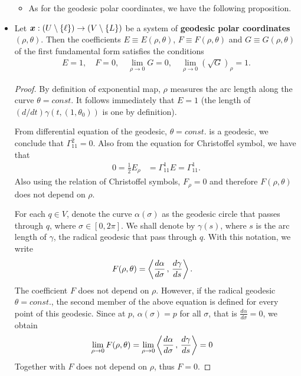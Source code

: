\documentclass[11pt]{article}
\begin{document}
\begin{itemize}
\begin{itemize}
\item As for the geodesic polar coordinates, we have the following proposition.
\end{itemize}

\item \begin{proposition}\label{prop: exp_map_first_fund}
Let $\boldsymbol{x}: (U \setminus \left\{\ell\right\})\rightarrow (V \setminus \left\{L\right\})$  be a system of \textbf{geodesic polar coordinates} $(\rho, \theta)$. Then the coefficients $E\equiv E(\rho, \theta)$, $F\equiv F(\rho, \theta)$ and $G\equiv G(\rho, \theta)$ of the first fundamental form satisfies the conditions
\begin{align*}
E = 1, \quad F=0, \quad \lim_{\rho \rightarrow 0}G = 0, \quad \lim_{\rho\rightarrow 0}(\sqrt{G})_{\rho} = 1.
\end{align*}
\end{proposition}
\begin{proof}
By definition of exponential map, $\rho$ measures the arc length along the curve $\theta = const.$ It follows immediately that $E= 1$ (the length of $(d/dt)\gamma(t,(1,\theta_{0}))$ is one by definition). 

From differential equation of the geodesic, $\theta = const.$ is a geodesic, we conclude that $\Gamma_{11}^{2} = 0$. Also from the equation for Christoffel symbol, we have that
\begin{align*}
0= \frac{1}{2}E_{\rho}&= \Gamma_{11}^{1}E = \Gamma_{11}^{1}.
\end{align*}
Also using the relation of Christoffel symbols, $F_{\rho} = 0$ and therefore $F(\rho, \theta)$ does not depend on $\rho$.

For each $q\in V$, denote the curve $\alpha(\sigma)$ as the geodesic circle that passes through $q$, where $\sigma\in [0,2\pi]$. We shall denote by $\gamma(s)$, where $s$ is the arc length of $\gamma$, the radical geodesic that pass through $q$.  With this notation, we write
\begin{align*}
F(\rho, \theta) &= \left\langle \frac{d\alpha}{d\sigma}\,,\, \frac{d\gamma}{ds} \right\rangle.
\end{align*}
The coefficient $F$ does not depend on $\rho$. However, if the radical geodesic $\theta = const.$, the second member of the above equation is defined for every point of this geodesic. Since at $p$, $\alpha(\sigma) = p$ for all $\sigma$, that is $\frac{d\alpha}{d\sigma} = 0$, we obtain
\begin{align*}
\lim_{\rho \rightarrow 0}F(\rho, \theta) &= \lim_{\rho \rightarrow 0}\left\langle \frac{d\alpha}{d\sigma}\,,\, \frac{d\gamma}{ds} \right\rangle = 0
\end{align*}
Together with $F$ does not depend on $\rho$, thus $F = 0$.


\end{proof}
\end{itemize}
\end{document}
